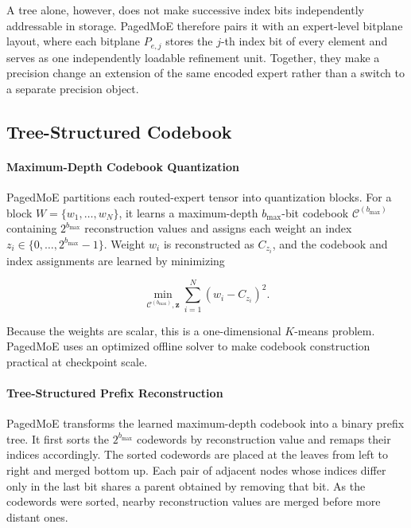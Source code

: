 \documentclass[sigconf, nonacm]{acmart}
\begin{document}
A tree alone, however, does not make successive index bits independently
addressable in storage. PagedMoE therefore pairs it with an expert-level
bitplane layout, where each bitplane \(P_{e,j}\) stores the \(j\)-th index bit
of every element and serves as one independently loadable refinement unit.
Together, they make a precision change an extension of the same encoded
expert rather than a switch to a separate precision object.

\subsection{Tree-Structured Codebook}
\label{sec:tree-quantization}

\paragraph{Maximum-Depth Codebook Quantization}
PagedMoE partitions each routed-expert tensor into quantization blocks.
For a block \(W=\{w_1,\ldots,w_N\}\), it learns a maximum-depth
\(b_{\max}\)-bit codebook \(\mathcal{C}^{(b_{\max})}\) containing
\(2^{b_{\max}}\) reconstruction values and assigns each weight an index
\(z_i\in\{0,\ldots,2^{b_{\max}}-1\}\). Weight \(w_i\) is reconstructed as
\(C_{z_i}\), and the codebook and index assignments are learned by minimizing

\[
\min_{\mathcal{C}^{(b_{\max})},\mathbf{z}}
\sum_{i=1}^{N}
\left(w_i-C_{z_i}\right)^2.
\]

Because the weights are scalar, this is a one-dimensional \(K\)-means
problem. PagedMoE uses an optimized offline solver to make codebook
construction practical at checkpoint scale. 


\paragraph{Tree-Structured Prefix Reconstruction}
PagedMoE transforms the learned maximum-depth codebook into a binary prefix
tree. It first sorts the \(2^{b_{\max}}\) codewords by reconstruction value and
remaps their indices accordingly. The sorted codewords are placed at the leaves from left to right and merged
bottom up. Each pair of adjacent nodes whose indices differ only in the
last bit shares a parent obtained by removing that bit. As the codewords were sorted, nearby
reconstruction values are merged before more distant ones.
\end{document}
